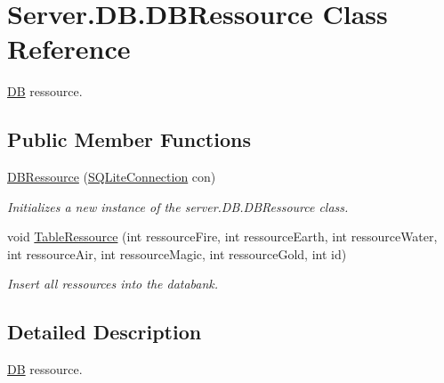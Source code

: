\hypertarget{classServer_1_1DB_1_1DBRessource}{\section{Server.\-D\-B.\-D\-B\-Ressource Class Reference}
\label{classServer_1_1DB_1_1DBRessource}
}


\hyperlink{namespaceServer_1_1DB}{D\-B} ressource.  


\subsection*{Public Member Functions}
\begin{DoxyCompactItemize}
\item 
\hyperlink{classServer_1_1DB_1_1DBRessource_ad3ae43c5661467a23be8b40386fde94f}{D\-B\-Ressource} (\hyperlink{classSQLite_1_1SQLiteConnection}{S\-Q\-Lite\-Connection} con)
\begin{DoxyCompactList}\small\item\em Initializes a new instance of the server.\-D\-B.\-D\-B\-Ressource class. \end{DoxyCompactList}\item 
void \hyperlink{classServer_1_1DB_1_1DBRessource_a7a0e9627e0ebde571a3211defbf86111}{Table\-Ressource} (int ressource\-Fire, int ressource\-Earth, int ressource\-Water, int ressource\-Air, int ressource\-Magic, int ressource\-Gold, int id)
\begin{DoxyCompactList}\small\item\em Insert all ressources into the databank. \end{DoxyCompactList}\end{DoxyCompactItemize}


\subsection{Detailed Description}
\hyperlink{namespaceServer_1_1DB}{D\-B} ressource. 



